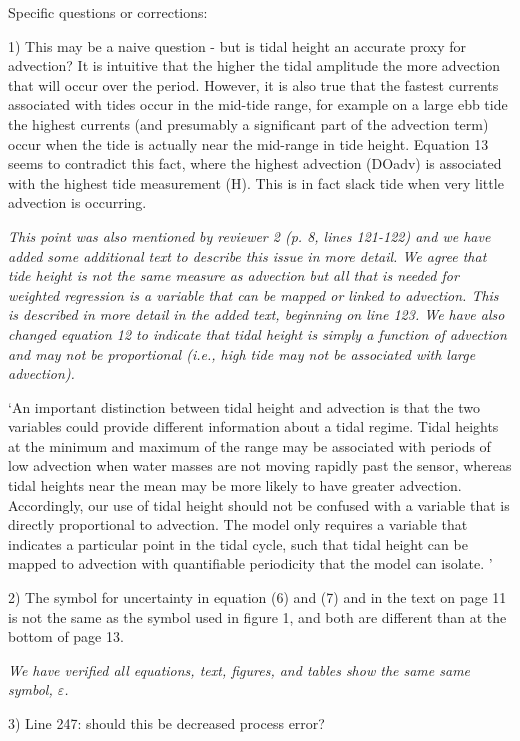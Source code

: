 \documentclass[letterpaper,12pt]{article}\usepackage[]{graphicx}\usepackage[]{color}
\begin{document}
Specific questions or corrections:

1) This may be a naive question -  but is tidal height an accurate proxy for advection? It is intuitive that the higher the tidal amplitude the more advection that will occur over the period. However, it is also true that the fastest currents associated with tides occur in the mid-tide range, for example on a large ebb tide the highest currents (and presumably a significant part of the advection term) occur when the tide is actually near the mid-range in tide height. Equation 13 seems to contradict this fact, where the highest advection (DOadv) is associated with the highest tide measurement (H). This is in fact slack tide when very little advection is occurring.

{\it This point was also mentioned by reviewer 2 (p. 8, lines 121-122) and we have added some additional text to describe this issue in more detail.  We agree that tide height is not the same measure as advection but all that is needed for weighted regression is a variable that can be mapped or linked to advection.  This is described in more detail in the added text, beginning on line 123.  We have also changed equation 12 to indicate that tidal height is simply a function of advection and may not be proportional (i.e., high tide may not be associated with large advection).

`An important distinction between tidal height and advection is that the two variables could provide different information about a tidal regime.  Tidal heights at the minimum and maximum of the range may be associated with periods of low advection when water masses are not moving rapidly past the sensor, whereas tidal heights near the mean may be more likely to have greater advection.  Accordingly, our use of tidal height should not be confused with a variable that is directly proportional to advection.  The model only requires a variable that indicates a particular point in the tidal cycle, such that tidal height can be mapped to advection with quantifiable periodicity that the model can isolate.     
'
}

2) The symbol for uncertainty in equation (6) and (7) and in the text on page 11 is not the same as the symbol used in figure 1, and both are different than at the bottom of page 13.

{\it We have verified all equations, text, figures, and tables show the same same symbol, $\varepsilon$.}

3) Line 247: should this be decreased process error?
\end{document}
